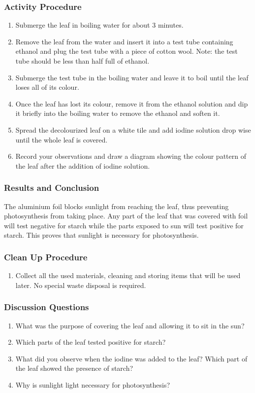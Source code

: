 \subsubsection*{Activity Procedure}
\begin{enumerate}
\item{Submerge the leaf in boiling water for about 3 minutes.}
\item{Remove the leaf from the water and insert it into a test tube containing ethanol and plug the test tube with a piece of cotton wool. Note: the test tube should be less than half full of ethanol.}
\item{Submerge the test tube in the boiling water and leave it to boil until the leaf loses all of its colour.}
\item{Once the leaf has lost its colour, remove it from the ethanol solution and dip it briefly into the boiling water to remove the ethanol and soften it.}
\item{Spread the decolourized leaf on a white tile and add iodine solution drop wise until the whole leaf is covered.}
\item{ Record your observations and draw a diagram showing the colour pattern of the leaf after the addition of iodine solution.}
\end{enumerate}

\subsubsection*{Results and Conclusion}
The aluminium foil blocks sunlight from reaching the leaf, thus preventing photosynthesis from taking place. Any part of the leaf that was covered with foil will test negative for starch while the parts exposed to sun will test positive for starch. This proves that sunlight is necessary for photosynthesis.

\subsubsection*{Clean Up Procedure}
\begin{enumerate}
\item{Collect all the used materials, cleaning and storing items that will be used later. No special waste disposal is required.}
\end{enumerate}

\subsubsection*{Discussion Questions}
\begin{enumerate}
\item{What was the purpose of covering the leaf and allowing it to sit in the sun?}
\item{Which parts of the leaf tested positive for starch?}
\item{What did you observe when the iodine was added to the leaf? Which part of the leaf showed the presence of starch?}
\item{Why is sunlight light necessary for photosynthesis?}
\end{enumerate}

